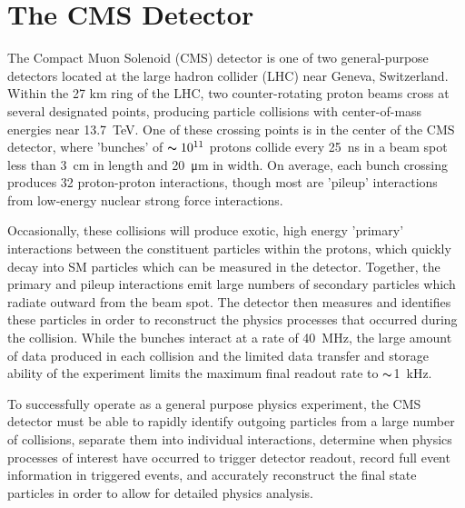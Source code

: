 \chapter{The CMS Detector}
\label{sec:detector}

The Compact Muon Solenoid (CMS) detector is one of two general-purpose detectors located at the large hadron collider (LHC) near Geneva, Switzerland. 
Within the 27 km ring of the LHC, two counter-rotating proton beams cross at several designated points, producing particle collisions with center-of-mass energies near \SI{13.7}{\tera\eV}. 
One of these crossing points is in the center of the CMS detector, where 'bunches' of $\thicksim10^{11}$ protons collide every \SI{25}{\nano\second} in a beam spot less than \SI{3}{\centi\meter} in length and \SI{20}{\micro\meter} in width. 
On average, each bunch crossing produces 32 proton-proton interactions, though most are 'pileup' interactions from low-energy nuclear strong force interactions.

Occasionally, these collisions will produce exotic, high energy 'primary' interactions between the constituent particles within the protons, which quickly decay into SM particles which can be measured in the detector.
Together, the primary and pileup interactions emit large numbers of secondary particles which radiate outward from the beam spot. 
The detector then measures and identifies these particles in order to reconstruct the physics processes that occurred during the collision. 
While the bunches interact at a rate of \SI{40}{\mega\hertz}, the large amount of data produced in each collision and the limited data transfer and storage ability of the experiment limits the maximum final readout rate to $\thicksim$\SI{1}{\kilo\hertz}.

To successfully operate as a general purpose physics experiment, the CMS detector must be able to rapidly identify outgoing particles from a large number of collisions, separate them into individual interactions, determine when physics processes of interest have occurred to trigger detector readout, record full event information in triggered events, and accurately reconstruct the final state particles in order to allow for detailed physics analysis. 

